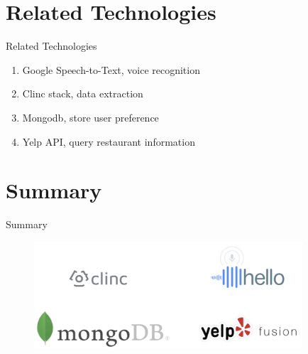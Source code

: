 \documentclass[aspectratio=169]{beamer}
\begin{document}
\section{Related Technologies}
\begin{frame}{Related Technologies}
\begin{enumerate}
    \item Google Speech-to-Text, voice recognition
\item Clinc stack, data extraction
\item Mongodb, store user preference
\item Yelp API, query restaurant information

\end{enumerate}
\end{frame}

\section{Summary}
\begin{frame}{Summary}
\begin{figure}
        \includegraphics[width=10cm]{image5}
\end{figure}

\end{frame}



\ThankYouFrame
\end{document}
